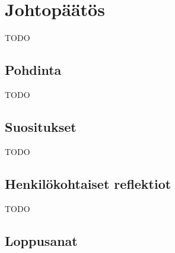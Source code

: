 \vspace{21.5pt}
\chapter{Johtopäätös}

TODO

\section{Pohdinta}

TODO



\section{Suositukset}

TODO

\section{Henkilökohtaiset reflektiot}

TODO



\section{Loppusanat}